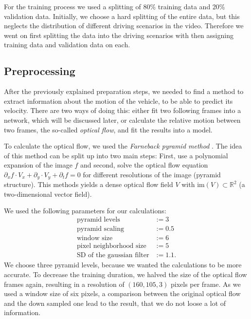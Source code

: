 \documentclass[conference]{IEEEtran}
\begin{document}
For the training process we used a splitting of 80\% training data and 20\% validation data. Initially, 
we choose a hard splitting of the entire data, but this neglects the distribution of different driving 
scenarios in the video. Therefore we went on first splitting the data into the driving scenarios with 
then assigning training data and validation data on each.

\subsection{Preprocessing}

After the previously explained preparation steps, we needed to find a method to extract information 
about the motion of the vehicle, to be able to predict its velocity. There are two ways of doing this: 
either fit two following frames into a network, which will be discussed later, or calculate the relative 
motion between two frames, the so-called \emph{optical flow}, and fit the results into a model.

To calculate the optical flow, we used the \emph{Farneback pyramid method} \cite{Farneback2003}.
The idea of this method can be split up into two main steps: First, use a polynomial expansion of the 
image $f$ and second, solve the optical flow equation
$\partial_x f \cdot V_x + \partial_y \cdot V_y + \partial_t f = 0$
for different resolutions of the image (pyramid structure). This methods yields a dense optical flow 
field $V$ with $\mathrm{im}(V) \subset \mathbb{R}^2$ (a two-dimensional vector field).

We used the following parameters for our calculations:
\begin{align*}
\text{pyramid levels} &:= 3 \\
\text{pyramid scaling} &:= 0.5\\
\text{window size} &:= 6\\
\text{pixel neighborhood size} &:= 5\\
\text{SD of the gaussian filter} &:= 1.1.
\end{align*}
We choose three pyramid levels, because we wanted the calculations to be more accurate. To decrease the 
training duration, we halved the size of the optical flow frames again, resulting in a resolution of
$(160,105,3)$ pixels per frame. As we used a window size of six pixels, a comparison between the 
original optical flow and the down sampled one lead to the result, that we do not loose a lot of 
information.
\end{document}
